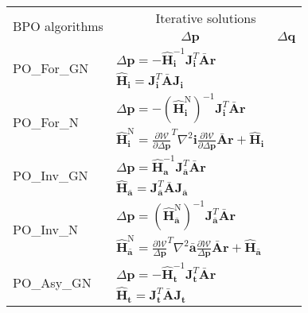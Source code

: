 \begin{table*}
\centering
\begin{tabular}{l|l|l}
	\toprule
	\multirow{2}{*}{BPO algorithms} & \multicolumn{2}{c}{Iterative solutions}
	\\
	& \multicolumn{1}{c|}{$\Delta\mathbf{p}$} & \multicolumn{1}{c}{$\Delta\mathbf{q}$}
	\\
	\midrule
	\multirow{2}{*}{PO\_For\_GN \cite{Amberg2009, Tzimiropoulos2013}} 
	& 
	$
	\Delta\mathbf{p} = -\hat{\mathbf{H}}_{\mathbf{i}}^{-1} \mathbf{J}_{\mathbf{i}}^T\bar{\mathbf{A}}\mathbf{r}
	$
	&
	\\
	& 
	$
	\hat{\mathbf{H}}_{\mathbf{i}} = \mathbf{J}_{\mathbf{i}}^T\bar{\mathbf{A}}\mathbf{J}_{\mathbf{i}} 
	$
	&
	\\
	\midrule
	\multirow{2}{*}{PO\_For\_N}
	& 
	$
	\Delta\mathbf{p} = -\left( \hat{\mathbf{H}}_{\mathbf{i}}^\textrm{N} \right)^{-1} \mathbf{J}_{\mathbf{i}}^T\bar{\mathbf{A}}\mathbf{r}
	$
	&
	\\
	& 
	$
	\hat{\mathbf{H}}_{\mathbf{i}}^{\textrm{N}} = \frac{\partial \mathcal{W}}{\partial\Delta \mathbf{p}}^T \nabla^2\mathbf{i} \frac{\partial \mathcal{W}}{\partial\Delta \mathbf{p}}\bar{\mathbf{A}}\mathbf{r} + \hat{\mathbf{H}}_{\mathbf{i}}
	$
	&
	\\
	\midrule
	\multirow{2}{*}{PO\_Inv\_GN \cite{Matthews2004}}
	& 
	$
	\Delta\mathbf{p} = \hat{\mathbf{H}}_{\mathbf{a}}^{-1} \mathbf{J}_{\bar{\mathbf{a}}}^T\bar{\mathbf{A}}\mathbf{r}
	$
	&
	\\
	& 
	$
	\hat{\mathbf{H}}_{\bar{\mathbf{a}}} = \mathbf{J}_{\bar{\mathbf{a}}}^T\bar{\mathbf{A}}\mathbf{J}_{\bar{\mathbf{a}}}
	$
	&
	\\
	\midrule
	\multirow{2}{*}{PO\_Inv\_N}
	&
	$
	\Delta\mathbf{p} = \left( \hat{\mathbf{H}}_{\bar{\mathbf{a}}}^{\textrm{N}} \right)^{-1} \mathbf{J}_{\bar{\mathbf{a}}}^T\bar{\mathbf{A}}\mathbf{r}
	$
	&
	\\
	& 
	$
	\hat{\mathbf{H}}_{\bar{\mathbf{a}}}^{\mathrm{N}} = \frac{\partial \mathcal{W}}{\Delta \mathbf{p}}^T \nabla^2\bar{\mathbf{a}} \frac{\partial \mathcal{W}}{\Delta \mathbf{p}}\bar{\mathbf{A}}\mathbf{r} + \hat{\mathbf{H}}_{\bar{\mathbf{a}}}
	$
	&
	\\
	\midrule
	\multirow{2}{*}{PO\_Asy\_GN} 
	& 
	$
	\Delta\mathbf{p} = -\hat{\mathbf{H}}_{\mathbf{t}}^{-1} \mathbf{J}_{\mathbf{t}}^T\bar{\mathbf{A}}\mathbf{r}
	$
	&
	\\
	& 
	$
	\hat{\mathbf{H}}_{\mathbf{t}} = \mathbf{J}_{\mathbf{t}}^T\bar{\mathbf{A}}\mathbf{J}_{\mathbf{t}} 
	$
	&
	\\

\end{tabular}
\end{table*}
